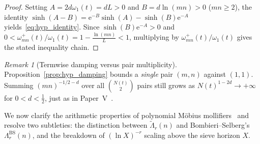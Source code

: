 \documentclass[11pt,reqno]{amsart}
\theoremstyle{definition}
\theoremstyle{remark}
\newtheorem{remark}[theorem]{Remark}
\numberwithin{equation}{section}
\newcommand{\ee}{\mathrm{e}}
\begin{document}
\begin{proof}
Setting $A = 2d\omega_1(t) = dL > 0$ and $B = d\ln(mn) > 0$ ($mn \ge 2$), the identity $\sinh(A - B) = \ee^{-B}\sinh(A) - \sinh(B)\ee^{-A}$ yields~\eqref{eq:hyp_identity}. Since $\sinh(B)\ee^{-A} > 0$ and $0 < \omega_{mn}^+(t)/\omega_1(t) = 1 - \frac{\ln(mn)}{L} < 1$, multiplying by $\omega_{mn}^+(t)/\omega_1(t)$ gives the stated inequality chain.
\end{proof}

\begin{remark}[Termwise damping versus pair multiplicity]
Proposition~\ref{prop:hyp_damping} bounds a \emph{single} pair $(m,n)$ against $(1,1)$. Summing $(mn)^{-1/2-d}$ over all $\binom{N(t)}{2}$ pairs still grows as $N(t)^{1-2d} \to +\infty$ for $0 < d < \frac{1}{2}$, just as in Paper~V~\cite{missiaen2026p5}.
\end{remark}

We now clarify the arithmetic properties of polynomial M\"obius mollifiers~\cite{selberg1942,levinson1974,conrey1989} and resolve two subtleties: the distinction between $\widetilde{\Lambda}_r(n)$ and Bombieri--Selberg's $\Lambda_r^{\mathrm{BS}}(n)$, and the breakdown of $(\ln X)^{-r}$ scaling above the sieve horizon $X$.
\end{document}
